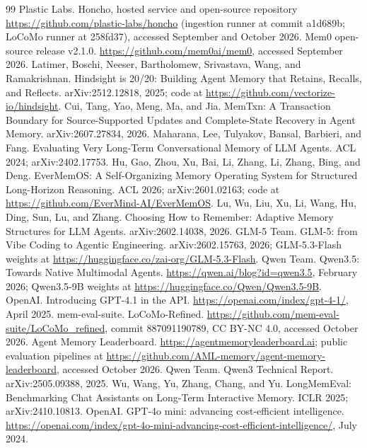 \documentclass{article}
\begin{document}
\begin{thebibliography}{99}
 Plastic Labs. Honcho, hosted service and open-source repository \url{https://github.com/plastic-labs/honcho} (ingestion runner at commit a1d689b; LoCoMo runner at 258fd37), accessed September and October 2026.
 Mem0 open-source release v2.1.0. \url{https://github.com/mem0ai/mem0}, accessed September 2026.
 Latimer, Boschi, Neeser, Bartholomew, Srivastava, Wang, and Ramakrishnan. Hindsight is 20/20: Building Agent Memory that Retains, Recalls, and Reflects. arXiv:2512.12818, 2025; code at \url{https://github.com/vectorize-io/hindsight}.
 Cui, Tang, Yao, Meng, Ma, and Jia. MemTxn: A Transaction Boundary for Source-Supported Updates and Complete-State Recovery in Agent Memory. arXiv:2607.27834, 2026.
 Maharana, Lee, Tulyakov, Bansal, Barbieri, and Fang. Evaluating Very Long-Term Conversational Memory of LLM Agents. ACL 2024; arXiv:2402.17753.
 Hu, Gao, Zhou, Xu, Bai, Li, Zhang, Li, Zhang, Bing, and Deng. EverMemOS: A Self-Organizing Memory Operating System for Structured Long-Horizon Reasoning. ACL 2026; arXiv:2601.02163; code at \url{https://github.com/EverMind-AI/EverMemOS}.
 Lu, Wu, Liu, Xu, Li, Wang, Hu, Ding, Sun, Lu, and Zhang. Choosing How to Remember: Adaptive Memory Structures for LLM Agents. arXiv:2602.14038, 2026.
 GLM-5 Team. GLM-5: from Vibe Coding to Agentic Engineering. arXiv:2602.15763, 2026; GLM-5.3-Flash weights at \url{https://huggingface.co/zai-org/GLM-5.3-Flash}.
 Qwen Team. Qwen3.5: Towards Native Multimodal Agents. \url{https://qwen.ai/blog?id=qwen3.5}, February 2026; Qwen3.5-9B weights at \url{https://huggingface.co/Qwen/Qwen3.5-9B}.
 OpenAI. Introducing GPT-4.1 in the API. \url{https://openai.com/index/gpt-4-1/}, April 2025.
 mem-eval-suite. LoCoMo-Refined. \url{https://github.com/mem-eval-suite/LoCoMo_refined}, commit 887091190789, CC BY-NC 4.0, accessed October 2026.
 Agent Memory Leaderboard. \url{https://agentmemoryleaderboard.ai}; public evaluation pipelines at \url{https://github.com/AML-memory/agent-memory-leaderboard}, accessed October 2026.
 Qwen Team. Qwen3 Technical Report. arXiv:2505.09388, 2025.
 Wu, Wang, Yu, Zhang, Chang, and Yu. LongMemEval: Benchmarking Chat Assistants on Long-Term Interactive Memory. ICLR 2025; arXiv:2410.10813.
 OpenAI. GPT-4o mini: advancing cost-efficient intelligence. \url{https://openai.com/index/gpt-4o-mini-advancing-cost-efficient-intelligence/}, July 2024.

\end{thebibliography}
\end{document}
